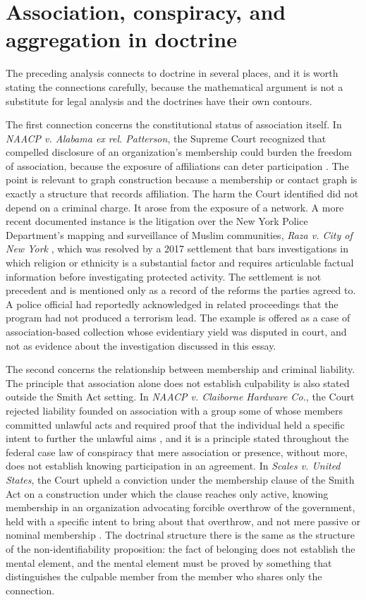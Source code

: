 \documentclass[11pt]{article}
\theoremstyle{definition}
\theoremstyle{remark}
\begin{document}
\section{Association, conspiracy, and aggregation in doctrine}

The preceding analysis connects to doctrine in several places, and it is worth stating the connections carefully, because the mathematical argument is not a substitute for legal analysis and the doctrines have their own contours.

The first connection concerns the constitutional status of association itself. In \emph{NAACP v. Alabama ex rel. Patterson}, the Supreme Court recognized that compelled disclosure of an organization's membership could burden the freedom of association, because the exposure of affiliations can deter participation \cite{naacp1958}. The point is relevant to graph construction because a membership or contact graph is exactly a structure that records affiliation. The harm the Court identified did not depend on a criminal charge. It arose from the exposure of a network. A more recent documented instance is the litigation over the New York Police Department's mapping and surveillance of Muslim communities, \emph{Raza v. City of New York} \cite{raza2013}, which was resolved by a 2017 settlement that bars investigations in which religion or ethnicity is a substantial factor and requires articulable factual information before investigating protected activity. The settlement is not precedent and is mentioned only as a record of the reforms the parties agreed to. A police official had reportedly acknowledged in related proceedings that the program had not produced a terrorism lead. The example is offered as a case of association-based collection whose evidentiary yield was disputed in court, and not as evidence about the investigation discussed in this essay.

The second concerns the relationship between membership and criminal liability. The principle that association alone does not establish culpability is also stated outside the Smith Act setting. In \emph{NAACP v. Claiborne Hardware Co.}, the Court rejected liability founded on association with a group some of whose members committed unlawful acts and required proof that the individual held a specific intent to further the unlawful aims \cite{claiborne1982}, and it is a principle stated throughout the federal case law of conspiracy that mere association or presence, without more, does not establish knowing participation in an agreement. In \emph{Scales v. United States}, the Court upheld a conviction under the membership clause of the Smith Act on a construction under which the clause reaches only active, knowing membership in an organization advocating forcible overthrow of the government, held with a specific intent to bring about that overthrow, and not mere passive or nominal membership \cite{scales1961}. The doctrinal structure there is the same as the structure of the non-identifiability proposition: the fact of belonging does not establish the mental element, and the mental element must be proved by something that distinguishes the culpable member from the member who shares only the connection.
\end{document}
